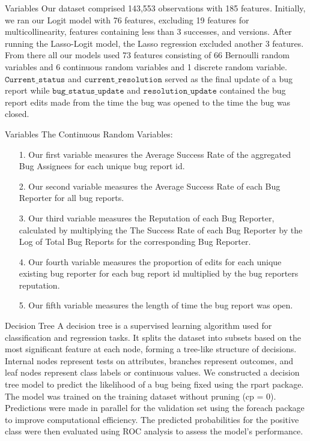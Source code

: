 \documentclass[10pt]{beamer}
\begin{document}
\begin{frame}[t]{Variables} \justifying \vspace{25pt}
	Our dataset comprised 143,553 observations with 185 features. Initially, we ran our Logit model with 76 features, excluding 19 features for multicollinearity, features containing less than 3 successes, and versions. After running the Lasso-Logit model, the Lasso regression excluded another 3 features. From there  all our models used 73 features consisting of 66 Bernoulli random variables and 6 continuous random variables and 1 discrete random variable. 
	$\texttt{Current\_status}$ and $\texttt{current\_resolution}$ served as the final update of a bug report while $\texttt{bug\_status\_update}$ and $\texttt{resolution\_update}$ contained the bug report edits made from the time the bug was opened to the time the bug was closed. 
\end{frame}


\begin{frame}[t]{Variables} \justifying \vspace{25pt}
	The Continuous Random Variables:
	\begin{enumerate}
	\item [1.] Our first variable measures the Average Success Rate of the aggregated Bug Assignees for each unique bug report id.
	\item [2.] Our second variable measures the Average Success Rate of each Bug Reporter for all bug reports.
	\item [3.] Our third variable measures the Reputation of each Bug Reporter, calculated by multiplying the The Success Rate of each Bug Reporter by the Log of Total Bug Reports for the corresponding Bug Reporter.
	\item [4.] Our fourth variable measures the proportion of edits for each unique existing bug reporter for each bug report id multiplied by the bug reporters reputation.
	\item [5.] Our fifth variable measures the length of time the bug report was open. 
	\end{enumerate}
\end{frame}


\begin{frame}[t]{Decision Tree}\justifying \vspace{10pt}
	A decision tree is a supervised learning algorithm used for classification and regression tasks. It splits the dataset into subsets based on the most significant feature at each node, forming a tree-like structure of decisions. Internal nodes represent tests on attributes, branches represent outcomes, and leaf nodes represent class labels or continuous values. 
	\vskip 8pt
	We constructed a decision tree model to predict the likelihood of a bug being fixed using the rpart package. The model was trained on the training dataset without pruning (cp = 0). Predictions were made in parallel for the validation set using the foreach package to improve computational efficiency. The predicted probabilities for the positive class were then evaluated using ROC analysis to assess the model's performance.
\end{frame}
\end{document}
